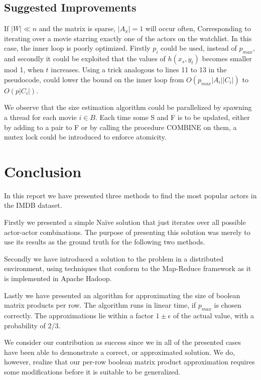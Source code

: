 \documentclass[a4paper,11pt]{article}
\begin{document}



\subsection{Suggested Improvements}
If $|W|\ll n$ and the matrix is sparse, $|A_{\pi}|=1$ will occur often, Corresponding to iterating over a movie starring exactly one of the actors on the watchlist. In this case, the inner loop is poorly optimized. Firstly $p_i$ could be used, instead of $p_{max}$, and secondly it could be exploited that the values of $h(x_s, y_t)$ becomes smaller mod 1, when $t$ increases. Using a trick analogous to lines 11 to 13 in the pseudocode, could lower the bound on the inner loop from $O(p_{max}|A_i||C_i|)$ to $O(p|C_i|)$.

We observe that the size estimation algorithm could be parallelized by spawning a thread for each movie  $i \in B$. Each time some S and F is to be updated, either by adding to a pair to F or by calling the procedure COMBINE on them, a mutex lock could be introduced to enforce atomicity. 


\section{Conclusion}
In this report we have presented three methods to find the most popular actors in the IMDB dataset.


Firstly we presented a simple Naïve solution that just iterates over all possible actor-actor combinations. The purpose of presenting this solution was merely to use its results as the ground truth for the following two methods.


Secondly we have introduced a solution to the problem in a distributed environment, using techniques that conform to the Map-Reduce framework as it is implemented in Apache Hadoop.


Lastly we have presented an algorithm for approximating the size of boolean matrix products per row. The algorithm runs in linear time, if $p_{max}$ is chosen correctly. The approximations lie within a factor $1\pm\epsilon$ of the actual value, with a probability of $2/3$.

We consider our contribution as success since we in all of the presented cases have been able to demonstrate a correct, or approximated solution. 
We do, however, realize that our per-row boolean matrix product approximation requires some modifications before it is suitable to be generalized.
\end{document}
